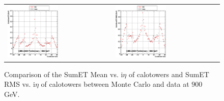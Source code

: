 \begin{figure}[h!]
 \centering
 \begin{tabular}{ll}
  \includegraphics[width=0.5\textwidth]{plots_DataVsMC_MB_900GeV/g_caloSumetMean_vs_ieta_900.eps} &
  \includegraphics[width=0.5\textwidth]{plots_DataVsMC_MB_900GeV/g_caloSumetRMS_vs_ieta_900.eps} \\
 \end{tabular}
 \caption{\small Comparison of the SumET Mean vs. i$\eta$ of calotowers and SumET RMS vs. i$\eta$ of calotowers between 
          Monte Carlo and data at $900$ GeV.\label{fig:SumET_MeanRMS_vs_ieta_900}}
\end{figure}

